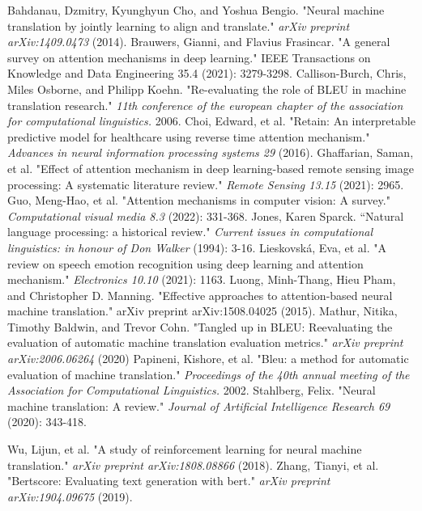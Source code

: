 \documentclass[conference]{IEEEtran}
\begin{document}
\begin{thebibliography}{00}
 Bahdanau, Dzmitry, Kyunghyun Cho, and Yoshua Bengio. "Neural machine translation by jointly learning to align and translate." \textit{arXiv preprint arXiv:1409.0473} (2014).
 Brauwers, Gianni, and Flavius Frasincar. "A general survey on attention mechanisms in deep learning." IEEE Transactions on Knowledge and Data Engineering 35.4 (2021): 3279-3298.
 Callison-Burch, Chris, Miles Osborne, and Philipp Koehn. "Re-evaluating the role of BLEU in machine translation research." \textit{11th conference of the european chapter of the association for computational linguistics.} 2006.
 Choi, Edward, et al. "Retain: An interpretable predictive model for healthcare using reverse time attention mechanism." \textit{Advances in neural information processing systems 29} (2016).
 Ghaffarian, Saman, et al. "Effect of attention mechanism in deep learning-based remote sensing image processing: A systematic literature review." \textit{Remote Sensing 13.15} (2021): 2965.
 Guo, Meng-Hao, et al. "Attention mechanisms in computer vision: A survey." \textit{Computational visual media 8.3 }(2022): 331-368.
 Jones, Karen Sparck. ``Natural language processing: a historical review." \textit{Current issues in computational linguistics: in honour of Don Walker} (1994): 3-16.
 Lieskovská, Eva, et al. "A review on speech emotion recognition using deep learning and attention mechanism." \textit{Electronics 10.10} (2021): 1163.
 Luong, Minh-Thang, Hieu Pham, and Christopher D. Manning. "Effective approaches to attention-based neural machine translation." arXiv preprint arXiv:1508.04025 (2015).   
 Mathur, Nitika, Timothy Baldwin, and Trevor Cohn. "Tangled up in BLEU: Reevaluating the evaluation of automatic machine translation evaluation metrics." \textit{arXiv preprint arXiv:2006.06264} (2020)
 Papineni, Kishore, et al. "Bleu: a method for automatic evaluation of machine translation." \textit{Proceedings of the 40th annual meeting of the Association for Computational Linguistics.} 2002.
  Stahlberg, Felix. "Neural machine translation: A review." \textit{Journal of Artificial Intelligence Research 69} (2020): 343-418.

 Wu, Lijun, et al. "A study of reinforcement learning for neural machine translation." \textit{arXiv preprint arXiv:1808.08866} (2018).
 Zhang, Tianyi, et al. "Bertscore: Evaluating text generation with bert." \textit{arXiv preprint arXiv:1904.09675} (2019).



\end{thebibliography}
\end{document}
